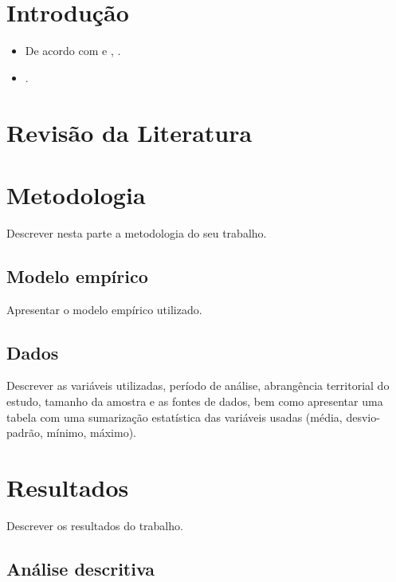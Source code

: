 \chapter{Introdução}

\lipsum[1-1]

\begin{itemize}
	\item De acordo com  e , \lipsum[1].
	\item \lipsum[1] \cite{VonBlanckenburg2012a, Lantz2013}.
\end{itemize}

\lipsum[1-5]

\chapter{Revisão da Literatura}

\lipsum[1-5]

\chapter{Metodologia}

Descrever nesta parte a metodologia do seu trabalho.

\section{Modelo empírico}

Apresentar o modelo empírico utilizado.

\lipsum[1-2]

\section{Dados}

Descrever as variáveis utilizadas, período de análise, abrangência territorial do estudo, tamanho da amostra e as fontes de dados, bem como apresentar uma tabela com uma sumarização estatística das variáveis usadas (média, desvio-padrão, mínimo, máximo).

\chapter{Resultados}

Descrever os resultados do trabalho.

\section{Análise descritiva}

